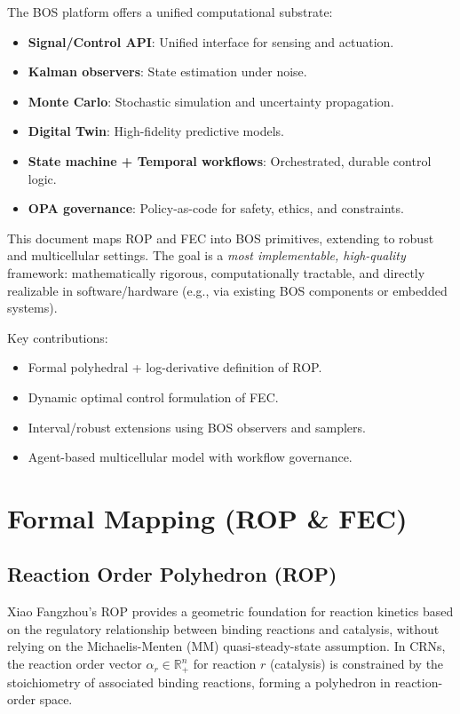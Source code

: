 \documentclass[11pt,a4paper]{article}
\begin{document}
The BOS platform offers a unified computational substrate: 
\begin{itemize}
    \item \textbf{Signal/Control API}: Unified interface for sensing and actuation.
    \item \textbf{Kalman observers}: State estimation under noise.
    \item \textbf{Monte Carlo}: Stochastic simulation and uncertainty propagation.
    \item \textbf{Digital Twin}: High-fidelity predictive models.
    \item \textbf{State machine + Temporal workflows}: Orchestrated, durable control logic.
    \item \textbf{OPA governance}: Policy-as-code for safety, ethics, and constraints.
\end{itemize}

This document maps ROP and FEC into BOS primitives, extending to robust and multicellular settings. The goal is a \emph{most implementable, high-quality} framework: mathematically rigorous, computationally tractable, and directly realizable in software/hardware (e.g., via existing BOS components or embedded systems).

Key contributions:
\begin{itemize}
    \item Formal polyhedral + log-derivative definition of ROP.
    \item Dynamic optimal control formulation of FEC.
    \item Interval/robust extensions using BOS observers and samplers.
    \item Agent-based multicellular model with workflow governance.
\end{itemize}

\section{Formal Mapping (ROP \& FEC)}

\subsection{Reaction Order Polyhedron (ROP)}

Xiao Fangzhou's ROP provides a geometric foundation for reaction kinetics based on the regulatory relationship between binding reactions and catalysis, without relying on the Michaelis-Menten (MM) quasi-steady-state assumption. In CRNs, the reaction order vector \(\alpha_r \in \mathbb{R}^n_+\) for reaction \(r\) (catalysis) is constrained by the stoichiometry of associated binding reactions, forming a polyhedron in reaction-order space.
\end{document}
